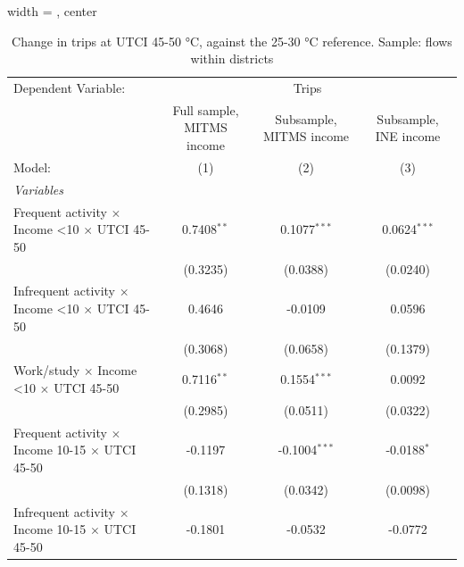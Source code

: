 
\begin{table}[htbp]
   \caption{\label{table_models_abc_45-50} Change in trips at UTCI 45-50 °C, against the 25-30 °C reference. Sample: flows within districts}
   \centering
   \small
   \begin{adjustbox}{width = \textwidth, center}
      \begin{tabular}{lccc}
         \tabularnewline \midrule \midrule
         Dependent Variable: & \multicolumn{3}{c}{Trips}\\
                                                                         & Full sample, MITMS income & Subsample, MITMS income & Subsample, INE income \\   
         Model:                                                          & (1)                       & (2)                     & (3)\\  
         \midrule
         \emph{Variables}\\
         Frequent activity $\times$ Income <10 $\times$ UTCI 45-50       & 0.7408$^{**}$             & 0.1077$^{***}$          & 0.0624$^{***}$\\   
                                                                         & (0.3235)                  & (0.0388)                & (0.0240)\\   
         Infrequent activity $\times$ Income <10 $\times$ UTCI 45-50     & 0.4646                    & -0.0109                 & 0.0596\\   
                                                                         & (0.3068)                  & (0.0658)                & (0.1379)\\   
         Work/study $\times$ Income <10 $\times$ UTCI 45-50              & 0.7116$^{**}$             & 0.1554$^{***}$          & 0.0092\\   
                                                                         & (0.2985)                  & (0.0511)                & (0.0322)\\   
         Frequent activity $\times$ Income 10-15 $\times$ UTCI 45-50     & -0.1197                   & -0.1004$^{***}$         & -0.0188$^{*}$\\   
                                                                         & (0.1318)                  & (0.0342)                & (0.0098)\\   
         Infrequent activity $\times$ Income 10-15 $\times$ UTCI 45-50   & -0.1801                   & -0.0532                 & -0.0772\\   

\end{tabular}
\end{adjustbox}
\end{table}
